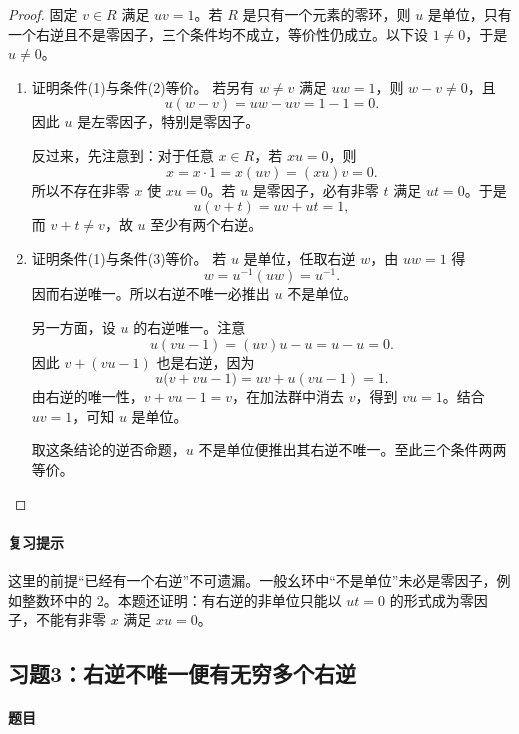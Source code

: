 \begin{proof}

固定 $v\in R$ 满足 $uv=1$。若 $R$ 是只有一个元素的零环，则 $u$ 是单位，只有一个右逆且不是零因子，三个条件均不成立，等价性仍成立。以下设 $1\ne0$，于是 $u\ne0$。

\begin{enumerate}\item 证明条件(1)与条件(2)等价。
若另有 $w\ne v$ 满足 $uw=1$，则 $w-v\ne0$，且
\[
u(w-v)=uw-uv=1-1=0.
\]
因此 $u$ 是左零因子，特别是零因子。

反过来，先注意到：对于任意 $x\in R$，若 $xu=0$，则
\[
x=x\cdot1=x(uv)=(xu)v=0.
\]
所以不存在非零 $x$ 使 $xu=0$。若 $u$ 是零因子，必有非零 $t$ 满足 $ut=0$。于是
\[
u(v+t)=uv+ut=1,
\]
而 $v+t\ne v$，故 $u$ 至少有两个右逆。

\item 证明条件(1)与条件(3)等价。
若 $u$ 是单位，任取右逆 $w$，由 $uw=1$ 得
\[
w=u^{-1}(uw)=u^{-1}.
\]
因而右逆唯一。所以右逆不唯一必推出 $u$ 不是单位。

另一方面，设 $u$ 的右逆唯一。注意
\[
u(vu-1)=(uv)u-u=u-u=0.
\]
因此 $v+(vu-1)$ 也是右逆，因为
\[
u\bigl(v+vu-1\bigr)=uv+u(vu-1)=1.
\]
由右逆的唯一性，$v+vu-1=v$，在加法群中消去 $v$，得到 $vu=1$。结合 $uv=1$，可知 $u$ 是单位。

取这条结论的逆否命题，$u$ 不是单位便推出其右逆不唯一。至此三个条件两两等价。
\end{enumerate}

\end{proof}

\paragraph{复习提示}

这里的前提“已经有一个右逆”不可遗漏。一般幺环中“不是单位”未必是零因子，例如整数环中的 $2$。本题还证明：有右逆的非单位只能以 $ut=0$ 的形式成为零因子，不能有非零 $x$ 满足 $xu=0$。



\subsection{习题3：右逆不唯一便有无穷多个右逆}

\label{ex:3:3}

\paragraph{题目}

